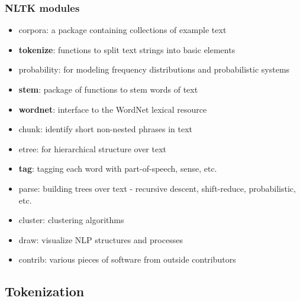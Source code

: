 \documentclass{beamer}
\begin{document}
\begin{frame}
\begin{columns}
	\end{columns}
	

\end{frame}

\begin{frame}

\frametitle{NLTK modules}

	\begin{itemize}
			
		\item corpora: a package containing collections of example text 
		\item {\bf tokenize}: functions to split text strings into basic elements
		\item probability: for modeling frequency distributions and probabilistic systems 
		\item {\bf stem}:  package of functions to stem words of text 
		\item {\bf wordnet}: interface to the WordNet lexical resource 
		\item chunk: identify short non-nested phrases in text 
		\item etree: for hierarchical structure over text 
		\item {\bf tag}: tagging each word with part-of-speech, sense, etc. 
		\item parse: building trees over text - recursive descent, shift-reduce, probabilistic, etc. 
		\item cluster: clustering algorithms 
		\item draw: visualize NLP structures and processes 
		\item contrib: various pieces of software from outside contributors 

	\end{itemize}

\end{frame}


\subsection{Tokenization}
\end{document}
